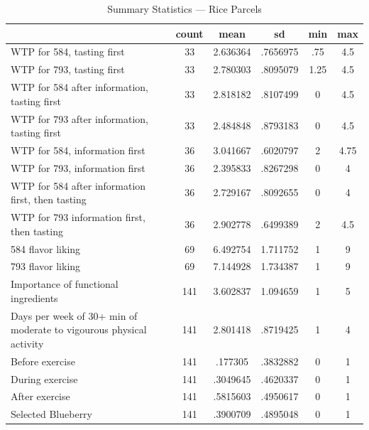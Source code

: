 \begin{table}[htbp]\centering
\def\sym#1{\ifmmode^{#1}\else\(^{#1}\)\fi}
\caption{Summary Statistics — Rice Parcels}
\begin{tabular}{l*{1}{ccccc}}
\hline\hline
                    &       count&        mean&          sd&         min&         max\\
\hline
WTP for 584, tasting first&          33&    2.636364&    .7656975&         .75&         4.5\\
WTP for 793, tasting first&          33&    2.780303&    .8095079&        1.25&         4.5\\
WTP for 584 after information, tasting first&          33&    2.818182&    .8107499&           0&         4.5\\
WTP for 793 after information, tasting first&          33&    2.484848&    .8793183&           0&         4.5\\
WTP for 584, information first&          36&    3.041667&    .6020797&           2&        4.75\\
WTP for 793, information first&          36&    2.395833&    .8267298&           0&           4\\
WTP for 584 after information first, then tasting&          36&    2.729167&    .8092655&           0&           4\\
WTP for 793 information first, then tasting&          36&    2.902778&    .6499389&           2&         4.5\\
584 flavor liking   &          69&    6.492754&    1.711752&           1&           9\\
793 flavor liking   &          69&    7.144928&    1.734387&           1&           9\\
Importance of functional ingredients&         141&    3.602837&    1.094659&           1&           5\\
Days per week of 30+ min of moderate to vigourous physical activity&         141&    2.801418&    .8719425&           1&           4\\
Before exercise     &         141&     .177305&    .3832882&           0&           1\\
During exercise     &         141&    .3049645&    .4620337&           0&           1\\
After exercise      &         141&    .5815603&    .4950617&           0&           1\\
Selected Blueberry  &         141&    .3900709&    .4895048&           0&           1\\

\end{tabular}
\end{table}
